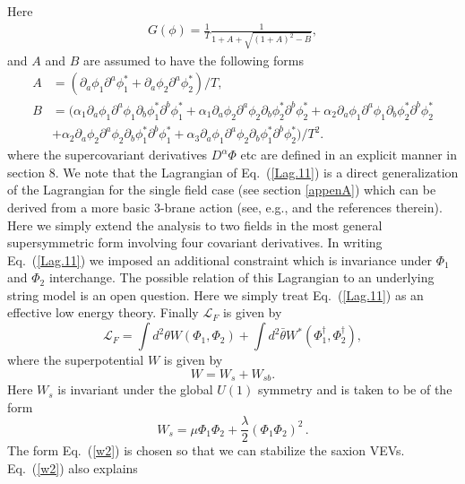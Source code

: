 \documentclass[a4paper,11pt]{article}
\def\non{\nonumber\\}
\def\non{\nonumber\\}
\begin{document}
  Here
  \begin{align}
    G(\phi) = \frac{1}{T}\frac{1}{1+ A +\sqrt{(1+A)^2 -B}},
  \end{align}
  and $A$ and $B$ are assumed to have the following forms
  \begin{align}
    A &= (\partial_a\phi_1 \partial^a \phi^*_1 + \partial_a\phi_2 \partial^a \phi^*_2)/T, \non
    B &= \Big(
      \alpha_1\partial_a \phi_1 \partial^a \phi_1 \partial_b \phi^*_1 \partial^b \phi^*_1
      + \alpha_1 \partial_a \phi_2 \partial^a \phi_2 \partial_b \phi^*_2 \partial^b \phi^*_2
      + \alpha_2 \partial_a \phi_1 \partial^a \phi_1 \partial_b \phi^*_2 \partial^b \phi^*_2 \non
    & + \alpha_2 \partial_a \phi_2 \partial^a \phi_2 \partial_b \phi^*_1 \partial^b \phi^*_1
      + \alpha_3 \partial_a \phi_1 \partial^a \phi_2 \partial_b \phi^*_1 \partial^b \phi^*_2
    \Big) / T^2.
    \label{Lag.22}
  \end{align}
  where the supercovariant derivatives $D^\alpha \Phi$ etc are defined in an explicit manner in section 8.
  We note that the Lagrangian of Eq.~(\ref{Lag.11}) is a direct generalization of the Lagrangian for the single field
  case (see section \ref{appenA}) which can be derived from a more basic 3-brane action 
  (see, e.g., \cite{Rocek:1997hi,Tseytlin:1999dj,Sasaki:2012ka} and the references
  therein). Here we simply extend the analysis to two fields
  in the most general supersymmetric form involving four covariant derivatives. In writing Eq.~(\ref{Lag.11}) we imposed
  an additional constraint which is invariance under $\Phi_1$ and $\Phi_2$ interchange.
  The possible relation of this Lagrangian
  to an underlying string model is an open question. Here we simply treat Eq.~(\ref{Lag.11}) as an effective low energy
  theory. Finally $\mathcal{L}_{F}$ is given by
  \begin{equation}
    \mathcal{L}_{F}=\int d^2\theta W\left(\Phi_1,\Phi_2\right)+\int d^2\bar\theta
    W^* \left(\Phi_1^\dagger,\Phi_2^\dagger\right),
  \end{equation}
  where the superpotential $W$ is given by
  \begin{equation}
    W=W_s+W_{sb}.
    \label{w1}
  \end{equation}
  Here $W_s$ is invariant under the global $U(1)$ symmetry and is taken to be of the form
  \begin{equation}
    W_s=\mu \Phi_1\Phi_2+\frac{\lambda}{2}{\left(\Phi_1\Phi_2\right)}^2\,.
    \label{w2}
  \end{equation}
  The form Eq.~(\ref{w2}) is chosen so that we can stabilize the saxion VEVs. Eq.~(\ref{w2}) also explains
\end{document}
